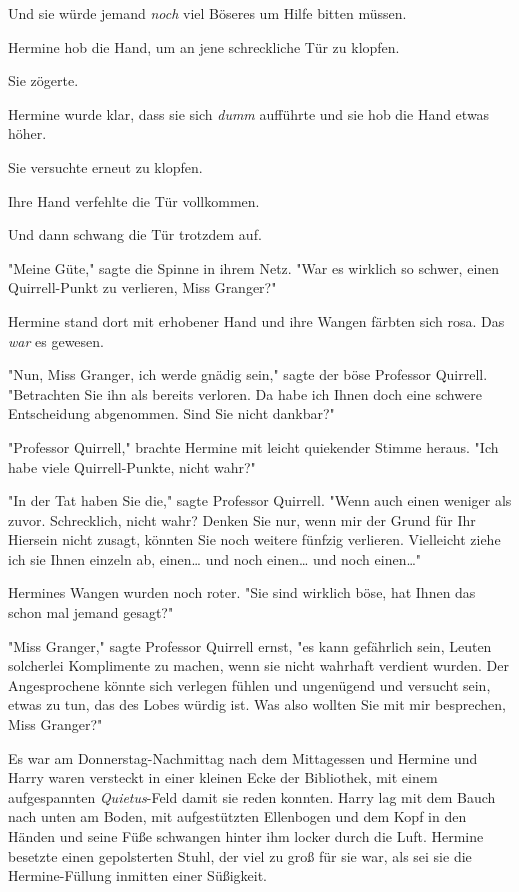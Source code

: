 {Und sie würde jemand \emph{noch} viel Böseres um Hilfe bitten müssen.

Hermine hob die Hand, um an jene schreckliche Tür zu klopfen.

Sie zögerte.

Hermine wurde klar, dass sie sich \emph{dumm} aufführte und sie hob die Hand etwas höher.

Sie versuchte erneut zu klopfen.

Ihre Hand verfehlte die Tür vollkommen.

Und dann schwang die Tür trotzdem auf.

"Meine Güte," sagte die Spinne in ihrem Netz. "War es wirklich so schwer, einen Quirrell-Punkt zu verlieren, Miss Granger?"

Hermine stand dort mit erhobener Hand und ihre Wangen färbten sich rosa. Das \emph{war} es gewesen.

"Nun, Miss Granger, ich werde gnädig sein," sagte der böse Professor Quirrell. "Betrachten Sie ihn als bereits verloren. Da habe ich Ihnen doch eine schwere Entscheidung abgenommen. Sind Sie nicht dankbar?"

"Professor Quirrell," brachte Hermine mit leicht quiekender Stimme heraus. "Ich habe viele Quirrell-Punkte, nicht wahr?"

"In der Tat haben Sie die," sagte Professor Quirrell. "Wenn auch einen weniger als zuvor. Schrecklich, nicht wahr? Denken Sie nur, wenn mir der Grund für Ihr Hiersein nicht zusagt, könnten Sie noch weitere fünfzig verlieren. Vielleicht ziehe ich sie Ihnen einzeln ab, einen… und noch einen… und noch einen…"

Hermines Wangen wurden noch roter. "Sie sind wirklich böse, hat Ihnen das schon mal jemand gesagt?"

"Miss Granger," sagte Professor Quirrell ernst, "es kann gefährlich sein, Leuten solcherlei Komplimente zu machen, wenn sie nicht wahrhaft verdient wurden. Der Angesprochene könnte sich verlegen fühlen und ungenügend und versucht sein, etwas zu tun, das des Lobes würdig ist. Was also wollten Sie mit mir besprechen, Miss Granger?"

\later

Es war am Donnerstag-Nachmittag nach dem Mittagessen und Hermine und Harry waren versteckt in einer kleinen Ecke der Bibliothek, mit einem aufgespannten \emph{Quietus}-Feld damit sie reden konnten. Harry lag mit dem Bauch nach unten am Boden, mit aufgestützten Ellenbogen und dem Kopf in den Händen und seine Füße schwangen hinter ihm locker durch die Luft. Hermine besetzte einen gepolsterten Stuhl, der viel zu groß für sie war, als sei sie die Hermine-Füllung inmitten einer Süßigkeit.

}
